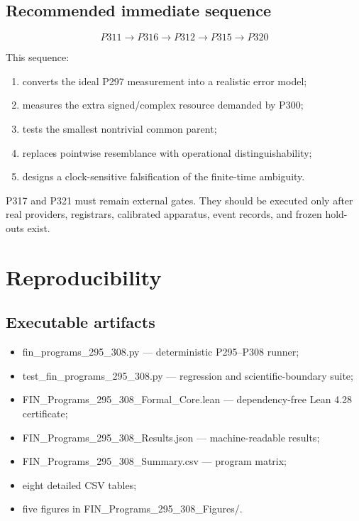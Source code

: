 \documentclass[11pt,a4paper,openany]{report}
\begin{document}
\section{Recommended immediate sequence}

\[
\boxed{
P311
\longrightarrow
P316
\longrightarrow
P312
\longrightarrow
P315
\longrightarrow
P320
}
\]

This sequence:

\begin{enumerate}
\item 
converts the ideal P297 measurement into a realistic error model;

\item 
measures the extra signed/\allowbreak{}complex resource demanded by P300;

\item 
tests the smallest nontrivial common parent;

\item 
replaces pointwise resemblance with operational distinguishability;

\item 
designs a clock-sensitive falsification of the finite-time ambiguity.

\end{enumerate}

P317 and P321 must remain external gates. They should be executed only after real providers, registrars, calibrated apparatus, event records, and frozen hold-outs exist.

\chapter{Reproducibility}

\section{Executable artifacts}

\begin{itemize}
\item 
fin\_programs\_295\_308.py --- deterministic P295--P308 runner;

\item 
test\_fin\_programs\_295\_308.py --- regression and scientific-boundary suite;

\item 
FIN\_Programs\_295\_308\_Formal\_Core.lean --- dependency-free Lean 4.28 certificate;

\item 
FIN\_Programs\_295\_308\_Results.json --- machine-readable results;

\item 
FIN\_Programs\_295\_308\_Summary.csv --- program matrix;

\item 
eight detailed CSV tables;

\item 
five figures in FIN\_Programs\_295\_308\_Figures/\allowbreak{}.

\end{itemize}
\end{document}
